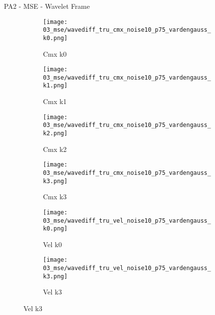 \documentclass{beamer}
\begin{document}
\begin{frame}{PA2 - MSE - Wavelet Frame}{}
\begin{figure}
\begin{subfigure}{0.24\textwidth}
\texttt{[image: 03\_mse/wavediff\_tru\_cmx\_noise10\_p75\_vardengauss\_k0.png]}
\vspace{-20pt}
\caption*{\tiny Cmx k0}
\end{subfigure}
\begin{subfigure}{0.24\textwidth}
\texttt{[image: 03\_mse/wavediff\_tru\_cmx\_noise10\_p75\_vardengauss\_k1.png]}
\vspace{-20pt}
\caption*{\tiny Cmx k1}
\end{subfigure}
\begin{subfigure}{0.24\textwidth}
\texttt{[image: 03\_mse/wavediff\_tru\_cmx\_noise10\_p75\_vardengauss\_k2.png]}
\vspace{-20pt}
\caption*{\tiny Cmx k2}
\end{subfigure}
\begin{subfigure}{0.24\textwidth}
\texttt{[image: 03\_mse/wavediff\_tru\_cmx\_noise10\_p75\_vardengauss\_k3.png]}
\vspace{-20pt}
\caption*{\tiny Cmx k3}
\end{subfigure}

\begin{subfigure}{0.49\textwidth}
\texttt{[image: 03\_mse/wavediff\_tru\_vel\_noise10\_p75\_vardengauss\_k0.png]}
\vspace{-20pt}
\caption*{\tiny Vel k0}
\end{subfigure}
\begin{subfigure}{0.49\textwidth}
\texttt{[image: 03\_mse/wavediff\_tru\_vel\_noise10\_p75\_vardengauss\_k3.png]}
\vspace{-20pt}
\caption*{\tiny Vel k3}
\end{subfigure}
\end{figure}
\end{frame}
\end{document}
